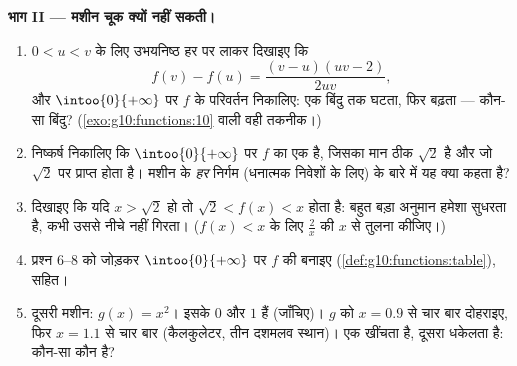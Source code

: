 \begin{problem}
\medskip
\noindent\textbf{भाग II --- मशीन चूक क्यों नहीं सकती।}
\begin{enumerate}[resume]
  \item $0 < u < v$ के लिए उभयनिष्ठ हर पर लाकर दिखाइए कि
        \[
        f(v) - f(u) = \frac{(v - u)(uv - 2)}{2uv} ,
        \]
        और $\intoo{0}{+\infty}$ पर $f$ के परिवर्तन निकालिए: एक बिंदु तक घटता, फिर बढ़ता
        --- कौन-सा बिंदु? (\cref{exo:g10:functions:10} वाली वही तकनीक।)
  \item निष्कर्ष निकालिए कि $\intoo{0}{+\infty}$ पर  $f$ का एक  है, जिसका मान
        ठीक $\sqrt2$ है और जो $\sqrt2$ पर प्राप्त होता है। मशीन के \emph{हर}
        निर्गम (धनात्मक निवेशों के लिए) के बारे में यह क्या कहता है?
  \item दिखाइए कि यदि $x > \sqrt2$ हो तो $\sqrt2 < f(x) < x$ होता है: बहुत बड़ा अनुमान हमेशा
        सुधरता है, कभी उससे नीचे नहीं गिरता। ($f(x) < x$ के लिए $\frac2x$ की $x$
        से तुलना कीजिए।)
  \item प्रश्न 6--8 को जोड़कर $\intoo{0}{+\infty}$ पर $f$ की  बनाइए
        (\cref{def:g10:functions:table}),  सहित।
  \item दूसरी मशीन: $g(x) = x^2$। इसके  $0$ और $1$ हैं (जाँचिए)।
        $g$ को $x = 0.9$ से चार बार दोहराइए, फिर $x = 1.1$ से चार बार
        (कैलकुलेटर, तीन दशमलव स्थान)। एक  खींचता है, दूसरा
        धकेलता है: कौन-सा कौन है?
\end{enumerate}


\end{problem}
